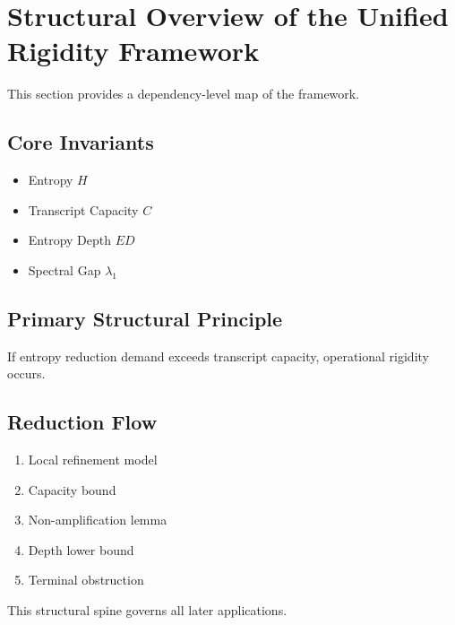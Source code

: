 \section{Structural Overview of the Unified Rigidity Framework}

This section provides a dependency-level map of the framework.

\subsection{Core Invariants}
\begin{itemize}
\item Entropy $H$
\item Transcript Capacity $C$
\item Entropy Depth $ED$
\item Spectral Gap $\lambda_1$
\end{itemize}

\subsection{Primary Structural Principle}

If entropy reduction demand exceeds transcript capacity,
operational rigidity occurs.

\subsection{Reduction Flow}

\begin{enumerate}
\item Local refinement model
\item Capacity bound
\item Non-amplification lemma
\item Depth lower bound
\item Terminal obstruction
\end{enumerate}

This structural spine governs all later applications.
